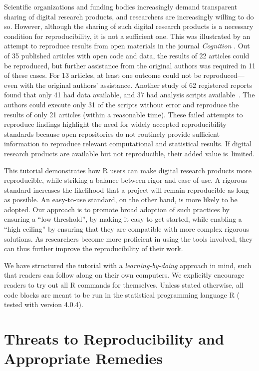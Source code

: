 \documentclass[psych,tutorial,accept,moreauthors,pdftex]{Definitions/mdpi}
\begin{document}
Scientific organizations and funding bodies increasingly demand
transparent sharing of digital research products, and researchers are
increasingly willing to do so. However, although the sharing of such
digital research products is a necessary condition for reproducibility,
it is not a sufficient one. This was illustrated by an attempt to
reproduce results from open materials in the journal \emph{Cognition}
\citep{hardwicke2018}. Out of 35 published articles with open code and
data, the results of 22 articles could be reproduced, but further assistance from the original authors was required in 11 of these cases. For 13
articles, at least one outcome could not be reproduced---even with the
original authors' assistance. Another study of 62 registered reports
found that only 41 had data available, and 37 had analysis scripts
available~\citep{obels2020}. The authors could execute only 31 of the
scripts without error and reproduce the results of only 21 articles
(within a reasonable time). These failed attempts to reproduce findings
highlight the need for widely accepted reproducibility standards because
open repositories do not routinely provide sufficient information to
reproduce relevant computational and statistical results. If digital
research products are available but not reproducible, their added value
is~limited.

This tutorial demonstrates how R users can make digital research
products more reproducible, while striking a balance between rigor and
ease-of-use. A rigorous standard increases the likelihood that a project
will remain reproducible as long as possible. An easy-to-use standard,
on the other hand, is more likely to be adopted. Our approach is to
promote broad adoption of such practices by ensuring a ``low
threshold'', by making it easy to get started, while enabling a ``high
ceiling'' by ensuring that they are compatible with more complex
rigorous solutions. As researchers become more proficient in using the
tools involved, they can thus further improve the reproducibility of
their work.

We have structured the tutorial with a \emph{learning-by-doing} approach
in mind, such that readers can follow along on their own computers. We
explicitly encourage readers to try out all R commands for themselves.
Unless stated otherwise, all code blocks are meant to be run in the
statistical programming language R (\citep{R-base} tested with version
4.0.4).

\section{Threats to Reproducibility and Appropriate
Remedies}\label{threats-to-reproducibility-and-appropriate-remedies}
\end{document}
